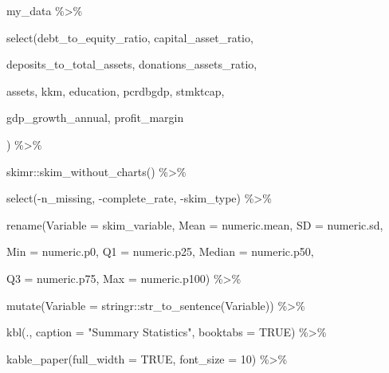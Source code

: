 \documentclass[a4paper,nobind]{templates/ociamthesis}
\newenvironment{Shaded}{\begin{snugshade}}{\end{snugshade}}
\newcommand{\AttributeTok}[1]{\textcolor[rgb]{0.77,0.63,0.00}{#1}}
\newcommand{\ConstantTok}[1]{\textcolor[rgb]{0.00,0.00,0.00}{#1}}
\newcommand{\DecValTok}[1]{\textcolor[rgb]{0.00,0.00,0.81}{#1}}
\newcommand{\FunctionTok}[1]{\textcolor[rgb]{0.00,0.00,0.00}{#1}}
\newcommand{\NormalTok}[1]{#1}
\newcommand{\SpecialCharTok}[1]{\textcolor[rgb]{0.00,0.00,0.00}{#1}}
\newcommand{\StringTok}[1]{\textcolor[rgb]{0.31,0.60,0.02}{#1}}
\renewenvironment{Shaded}
{
  \vspace{10pt}%
  \begin{snugshade}%
}{%
  \end{snugshade}%
  \vspace{8pt}%
}
\begin{document}
\begin{landscape}

\begin{Shaded}
\begin{Highlighting}[]
\NormalTok{my\_data }\SpecialCharTok{\%\textgreater{}\%} 
  
  \FunctionTok{select}\NormalTok{(debt\_to\_equity\_ratio, capital\_asset\_ratio, }
         
\NormalTok{         deposits\_to\_total\_assets, donations\_assets\_ratio, }
         
\NormalTok{         assets, kkm, education, pcrdbgdp, stmktcap,}
         
\NormalTok{         gdp\_growth\_annual, profit\_margin  }
         
\NormalTok{         ) }\SpecialCharTok{\%\textgreater{}\%} 
  
\NormalTok{  skimr}\SpecialCharTok{::}\FunctionTok{skim\_without\_charts}\NormalTok{() }\SpecialCharTok{\%\textgreater{}\%} 
  
  \FunctionTok{select}\NormalTok{(}\SpecialCharTok{{-}}\NormalTok{n\_missing, }\SpecialCharTok{{-}}\NormalTok{complete\_rate, }\SpecialCharTok{{-}}\NormalTok{skim\_type) }\SpecialCharTok{\%\textgreater{}\%} 
  
  \FunctionTok{rename}\NormalTok{(}\AttributeTok{Variable =}\NormalTok{ skim\_variable, }\AttributeTok{Mean =}\NormalTok{ numeric.mean, }\AttributeTok{SD =}\NormalTok{ numeric.sd, }
         
         \AttributeTok{Min =}\NormalTok{ numeric.p0, }\AttributeTok{Q1 =}\NormalTok{ numeric.p25, }\AttributeTok{Median =}\NormalTok{ numeric.p50,}
         
         \AttributeTok{Q3 =}\NormalTok{ numeric.p75, }\AttributeTok{Max =}\NormalTok{ numeric.p100) }\SpecialCharTok{\%\textgreater{}\%} 
  
  \FunctionTok{mutate}\NormalTok{(}\AttributeTok{Variable =}\NormalTok{ stringr}\SpecialCharTok{::}\FunctionTok{str\_to\_sentence}\NormalTok{(Variable)) }\SpecialCharTok{\%\textgreater{}\%} 
  
  \FunctionTok{kbl}\NormalTok{(., }\AttributeTok{caption =} \StringTok{"Summary Statistics"}\NormalTok{, }\AttributeTok{booktabs =} \ConstantTok{TRUE}\NormalTok{) }\SpecialCharTok{\%\textgreater{}\%} 
  
  \FunctionTok{kable\_paper}\NormalTok{(}\AttributeTok{full\_width =} \ConstantTok{TRUE}\NormalTok{, }\AttributeTok{font\_size =} \DecValTok{10}\NormalTok{) }\SpecialCharTok{\%\textgreater{}\%} 
  

\end{Highlighting}
\end{Shaded}
\end{landscape}
\end{document}
